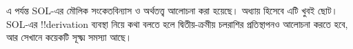 \documentclass[../../../include/open-logic-chapter]{subfiles}
\begin{document}

\begin{editorial}
এ পর্যন্ত SOL-এর মৌলিক সংকেতবিন্যাস ও অর্থতত্ত্ব আলোচনা করা হয়েছে।
অধ্যায় হিসেবে এটি খুবই ছোট। SOL-এর !!{derivation} ব্যবস্থা নিয়ে কথা
বলতে হলে দ্বিতীয়-ক্রমীয় চলরাশির প্রতিস্থাপনও আলোচনা করতে হবে, আর
সেখানে কয়েকটি সূক্ষ্ম সমস্যা আছে।
\end{editorial}







\OLEndChapterHook
\end{document}
